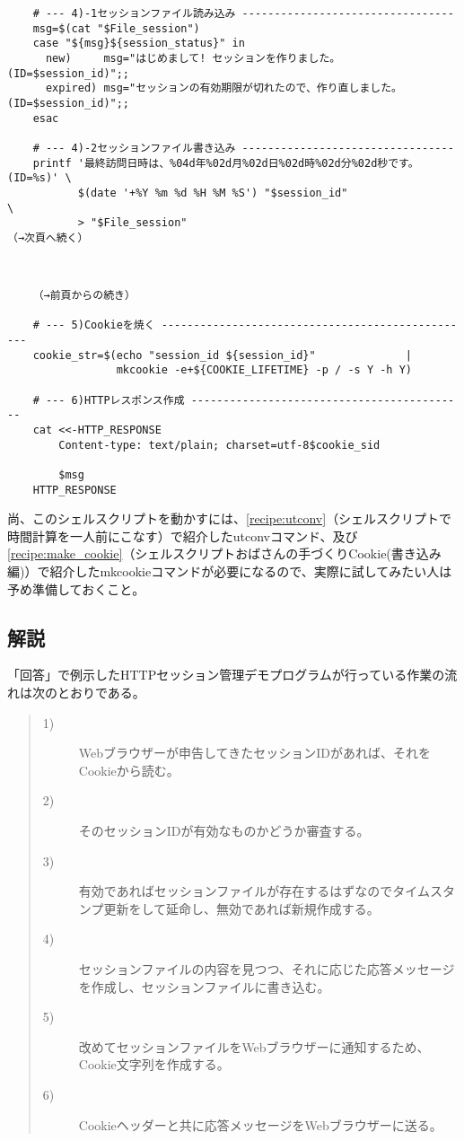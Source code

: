 \begin{frameboxit}{160.0mm}
\begin{verbatim}
	# --- 4)-1セッションファイル読み込み ---------------------------------
	msg=$(cat "$File_session")
	case "${msg}${session_status}" in
	  new)     msg="はじめまして! セッションを作りました。(ID=$session_id)";;
	  expired) msg="セッションの有効期限が切れたので、作り直しました。(ID=$session_id)";;
	esac
	
	# --- 4)-2セッションファイル書き込み ---------------------------------
	printf '最終訪問日時は、%04d年%02d月%02d日%02d時%02d分%02d秒です。(ID=%s)' \
	       $(date '+%Y %m %d %H %M %S') "$session_id"                            \
	       > "$File_session"                                                            （→次頁へ続く）
\end{verbatim}
\end{frameboxit} \\
\begin{frameboxit}{160.0mm}
\begin{verbatim}
	（→前頁からの続き）
	
	# --- 5)Cookieを焼く -------------------------------------------------
	cookie_str=$(echo "session_id ${session_id}"              |
	             mkcookie -e+${COOKIE_LIFETIME} -p / -s Y -h Y)
	
	# --- 6)HTTPレスポンス作成 -------------------------------------------
	cat <<-HTTP_RESPONSE
	    Content-type: text/plain; charset=utf-8$cookie_sid
	
	    $msg
	HTTP_RESPONSE
\end{verbatim}
\end{frameboxit}

尚、このシェルスクリプトを動かすには、\ref{recipe:utconv}（シェルスクリプトで時間計算を一人前にこなす）で紹介したutconvコマンド、及び\ref{recipe:make_cookie}（シェルスクリプトおばさんの手づくりCookie(書き込み編)）で紹介したmkcookieコマンドが必要になるので、実際に試してみたい人は予め準備しておくこと。

\subsection*{解説}

「回答」で例示したHTTPセッション管理デモプログラムが行っている作業の流れは次のとおりである。
\begin{quote}
\begin{description}
  \item[1)] Webブラウザーが申告してきたセッションIDがあれば、それをCookieから読む。
  \item[2)] そのセッションIDが有効なものかどうか審査する。
  \item[3)] 有効であればセッションファイルが存在するはずなのでタイムスタンプ更新をして延命し、無効であれば新規作成する。
  \item[4)] セッションファイルの内容を見つつ、それに応じた応答メッセージを作成し、セッションファイルに書き込む。
  \item[5)] 改めてセッションファイルをWebブラウザーに通知するため、Cookie文字列を作成する。
  \item[6)] Cookieヘッダーと共に応答メッセージをWebブラウザーに送る。
\end{description}
\end{quote}

